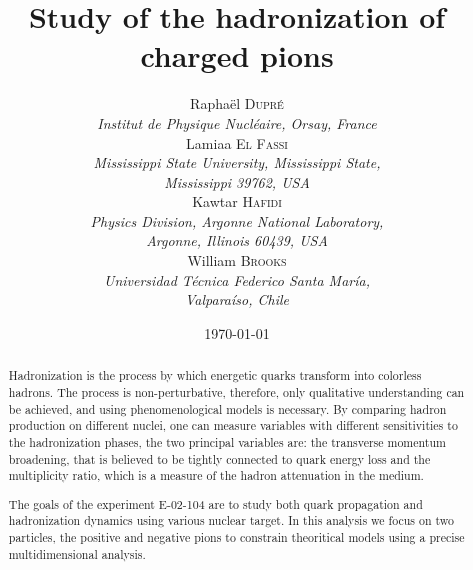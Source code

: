 \documentclass[a4paper,12pt,twoside]{article}
\title{Study of the hadronization of charged pions}
\author{
  Rapha\"el \textsc{Dupr\'e} \\ 
  {\it Institut de Physique Nucl\'eaire, Orsay, France} \\
  Lamiaa \textsc{El Fassi} \\ 
  {\it Mississippi State University, Mississippi State,} \\ 
  {\it Mississippi 39762, USA} \\
  Kawtar \textsc{Hafidi} \\ 
  {\it Physics Division, Argonne National Laboratory,} \\ 
  {\it Argonne, Illinois 60439, USA} \\
  William \textsc{Brooks} \\
  {\it Universidad T\'ecnica Federico Santa Mar\'ia,} \\ 
  {\it Valpara\'iso, Chile} 
}
\date{\today}
\begin{document}
\maketitle

\renewcommand{\baselinestretch}{1.10}

\begin{abstract}
Hadronization is the process by which energetic quarks transform into 
colorless hadrons. The process is non-perturbative, therefore, only 
qualitative understanding can be achieved, and using phenomenological models 
is necessary. By comparing hadron production 
on different nuclei, one can measure variables with different sensitivities 
to the hadronization phases, the two principal variables are: the transverse 
momentum broadening, that is believed to be tightly connected to quark energy 
loss and the multiplicity ratio, which is a measure of the hadron attenuation 
in the medium.

The goals of the experiment E-02-104 are to study both quark propagation
and hadronization dynamics using various nuclear target.
In this analysis we focus on two particles, the positive and negative pions
to constrain theoritical models using a precise multidimensional analysis.

\end{abstract}

\newpage

\tableofcontents

\newpage









\end{document}
